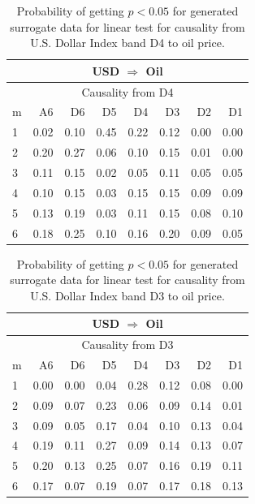 %
%
\begin{table}[H]
\begin{center}
\begin{tabular}{l|r r r r r r r}
\hline\hline
\multicolumn{8}{c}{USD $\Rightarrow$ Oil}\\
\hline
\multicolumn{8}{c}{Causality from D4}\\
\hline\hline
m & A6 & D6 & D5 & D4 & D3 & D2 & D1 \\
\hline
1 & 0.02 & 0.10 & 0.45 & 0.22 & 0.12 & 0.00 & 0.00 \\
2 & 0.20 & 0.27 & 0.06 & 0.10 & 0.15 & 0.01 & 0.00 \\
3 & 0.11 & 0.15 & 0.02 & 0.05 & 0.11 & 0.05 & 0.05 \\
4 & 0.10 & 0.15 & 0.03 & 0.15 & 0.15 & 0.09 & 0.09 \\
5 & 0.13 & 0.19 & 0.03 & 0.11 & 0.15 & 0.08 & 0.10 \\
6 & 0.18 & 0.25 & 0.10 & 0.16 & 0.20 & 0.09 & 0.05 \\
\hline\hline
\end{tabular}
\caption{Probability of getting $p < 0.05$ for generated surrogate data for linear test for causality from U.S. Dollar Index band D4 to oil price.}
\end{center}
\end{table}

%
%
\begin{table}[H]
\begin{center}
\begin{tabular}{l|r r r r r r r}
\hline\hline
\multicolumn{8}{c}{USD $\Rightarrow$ Oil}\\
\hline
\multicolumn{8}{c}{Causality from D3}\\
\hline\hline
m & A6 & D6 & D5 & D4 & D3 & D2 & D1 \\
\hline
1 & 0.00 & 0.00 & 0.04 & 0.28 & 0.12 & 0.08 & 0.00 \\
2 & 0.09 & 0.07 & 0.23 & 0.06 & 0.09 & 0.14 & 0.01 \\
3 & 0.09 & 0.05 & 0.17 & 0.04 & 0.10 & 0.13 & 0.04 \\
4 & 0.19 & 0.11 & 0.27 & 0.09 & 0.14 & 0.13 & 0.07 \\
5 & 0.20 & 0.13 & 0.25 & 0.07 & 0.16 & 0.19 & 0.11 \\
6 & 0.17 & 0.07 & 0.19 & 0.07 & 0.17 & 0.18 & 0.13 \\
\hline\hline
\end{tabular}
\caption{Probability of getting $p < 0.05$ for generated surrogate data for linear test for causality from U.S. Dollar Index band D3 to oil price.}
\end{center}
\end{table}

